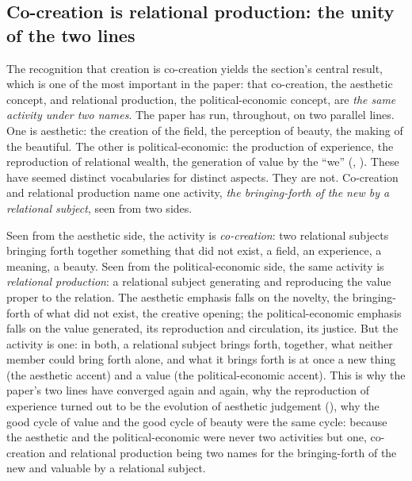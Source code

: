 \subsection{Co-creation is relational production: the unity of the two lines}
\label{p21:sub:cr-unity}

The recognition that creation is co-creation yields the section's central result, which is one of the most important in the paper: that co-creation, the aesthetic concept, and relational production, the political-economic concept, are \emph{the same activity under two names}. The paper has run, throughout, on two parallel lines. One is aesthetic: the creation of the field, the perception of beauty, the making of the beautiful. The other is political-economic: the production of experience, the reproduction of relational wealth, the generation of value by the ``we'' (, ). These have seemed distinct vocabularies for distinct aspects. They are not. Co-creation and relational production name one activity, \emph{the bringing-forth of the new by a relational subject}, seen from two sides.

Seen from the aesthetic side, the activity is \emph{co-creation}: two relational subjects bringing forth together something that did not exist, a field, an experience, a meaning, a beauty. Seen from the political-economic side, the same activity is \emph{relational production}: a relational subject generating and reproducing the value proper to the relation. The aesthetic emphasis falls on the novelty, the bringing-forth of what did not exist, the creative opening; the political-economic emphasis falls on the value generated, its reproduction and circulation, its justice. But the activity is one: in both, a relational subject brings forth, together, what neither member could bring forth alone, and what it brings forth is at once a new thing (the aesthetic accent) and a value (the political-economic accent). This is why the paper's two lines have converged again and again, why the reproduction of experience turned out to be the evolution of aesthetic judgement (), why the good cycle of value and the good cycle of beauty were the same cycle: because the aesthetic and the political-economic were never two activities but one, co-creation and relational production being two names for the bringing-forth of the new and valuable by a relational subject.


